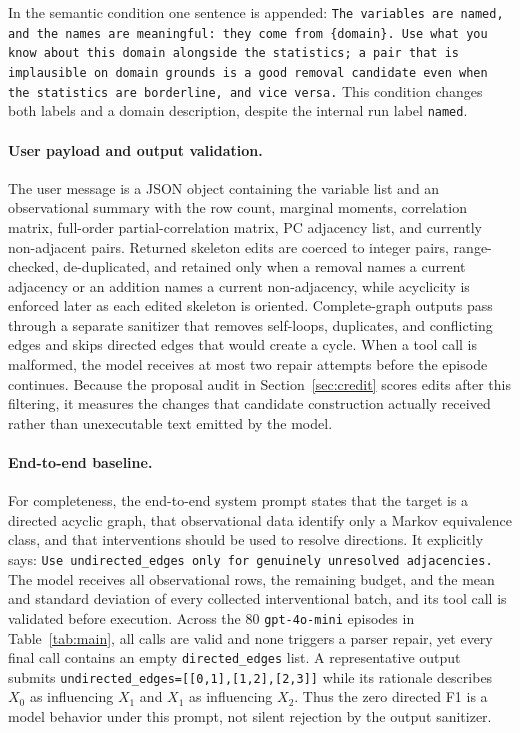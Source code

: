 \documentclass{article}
\begin{document}
In the semantic condition one sentence is appended: \texttt{The variables are named, and the names
are meaningful: they come from \{domain\}. Use what you know about this domain alongside the
statistics; a pair that is implausible on domain grounds is a good removal candidate even when the
statistics are borderline, and vice versa.} This condition changes both labels and a domain
description, despite the internal run label \texttt{named}.

\paragraph{User payload and output validation.}
The user message is a JSON object containing the variable list and an observational summary with the
row count, marginal moments, correlation matrix, full-order partial-correlation matrix, PC adjacency
list, and currently non-adjacent pairs. Returned skeleton edits are coerced to integer pairs,
range-checked, de-duplicated, and retained only when a removal names a current adjacency or an
addition names a current non-adjacency, while acyclicity is enforced later as each edited skeleton
is oriented. Complete-graph outputs pass through a separate sanitizer that removes self-loops,
duplicates, and conflicting edges and skips directed edges that would create a cycle. When a tool
call is malformed, the model receives at most two repair attempts before the episode continues.
Because the proposal audit in Section~\ref{sec:credit} scores edits after this filtering, it measures
the changes that candidate construction actually received rather than unexecutable text emitted by
the model.

\paragraph{End-to-end baseline.}
For completeness, the end-to-end system prompt states that the target is a directed acyclic graph,
that observational data identify only a Markov equivalence class, and that interventions should be
used to resolve directions. It explicitly says: \texttt{Use undirected\_edges only for genuinely
unresolved adjacencies.} The model receives all observational rows, the remaining budget, and the
mean and standard deviation of every collected interventional batch, and its tool call is validated
before execution. Across the $80$ \texttt{gpt-4o-mini} episodes in Table~\ref{tab:main}, all calls
are valid and none triggers a parser repair, yet every final call contains an empty
\texttt{directed\_edges} list. A representative output submits
\texttt{undirected\_edges=[[0,1],[1,2],[2,3]]} while its rationale describes $X_0$ as influencing
$X_1$ and $X_1$ as influencing $X_2$. Thus the zero directed F1 is a model behavior under this
prompt, not silent rejection by the output sanitizer.
\end{document}
